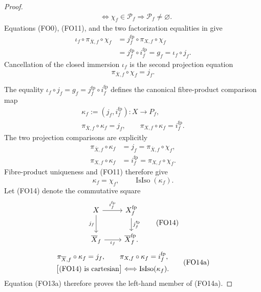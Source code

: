 \begin{proof}
\[\begin{aligned}
      &\Longleftrightarrow\chi_f\in\mathscr P_f
       \Longrightarrow\mathscr P_f\neq\varnothing.
  \end{aligned}                                                     \tag{FO11}
  \]
  Equations (FO0), (FO11), and the two factorization equalities in
   give
  \[
  \begin{aligned}
    \iota_f\circ\pi_{\overline X,f}\circ\chi_f
      &=j_f^{\mathrm{fp}}\circ\pi_{X,f}\circ\chi_f\\
      &=j_f^{\mathrm{fp}}\circ i_f^{\mathrm{fp}}
       =g_f
       =\iota_f\circ j_f.
  \end{aligned}
  \]
  Cancellation of the closed immersion $\iota_f$ is the second projection
  equation
  \[
    \pi_{\overline X,f}\circ\chi_f=j_f.                          \tag{FO12}
  \]

  The equality
  $\iota_f\circ j_f=g_f=j_f^{\mathrm{fp}}\circ i_f^{\mathrm{fp}}$
  defines the canonical fibre-product comparison map
  \[
  \begin{gathered}
    \kappa_f:=(j_f,i_f^{\mathrm{fp}})\colon X\to P_f,\\
    \pi_{\overline X,f}\circ\kappa_f=j_f,
    \qquad
    \pi_{X,f}\circ\kappa_f=i_f^{\mathrm{fp}}.
  \end{gathered}                                                    \tag{FO13}
  \]
  The two projection comparisons are explicitly
  \[
  \begin{aligned}
    \pi_{\overline X,f}\circ\kappa_f
      &=j_f=\pi_{\overline X,f}\circ\chi_f,\\
    \pi_{X,f}\circ\kappa_f
      &=i_f^{\mathrm{fp}}=\pi_{X,f}\circ\chi_f.
  \end{aligned}
  \]
  Fibre-product uniqueness and (FO11) therefore give
  \[
    \kappa_f=\chi_f,
    \qquad
    \operatorname{IsIso}(\kappa_f).                              \tag{FO13a}
  \]
  Let (FO14) denote the commutative square
  \[
  \begin{tikzcd}
    X \arrow[r,"i_f^{\mathrm{fp}}"] \arrow[d,"j_f"'] &
      X_f^{\mathrm{fp}} \arrow[d,"j_f^{\mathrm{fp}}"] \\
    \overline X_f \arrow[r,"\iota_f"'] & \overline X_f^{\mathrm{fp}}.
  \end{tikzcd}                                                       \tag{FO14}
  \]
  \[
  \begin{gathered}
    \pi_{\overline X,f}\circ\kappa_f=j_f,
    \qquad
    \pi_{X,f}\circ\kappa_f=i_f^{\mathrm{fp}},\\
    \bigl[\textup{(FO14) is cartesian}\bigr]
      \Longleftrightarrow\operatorname{IsIso}(\kappa_f).
  \end{gathered}                                                    \tag{FO14a}
  \]
  Equation (FO13a) therefore proves the left-hand member of (FO14a).


\end{proof}
